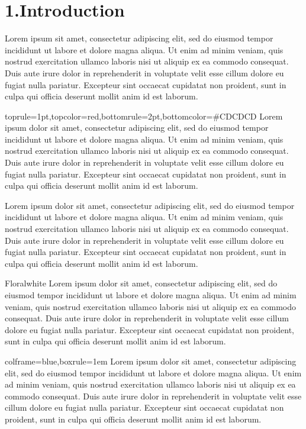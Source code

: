 \documentclass{book}
\newcommand\GFbox{%
  \collectbox*[\color{green}]{\fbox}%
}
\begin{document}
 
\section*{1.\enskip{}Introduction}
 
\GFbox{Lorem ipsum}  sit amet, consectetur adipiscing elit, sed do eiusmod tempor incididunt ut labore et dolore magna aliqua. Ut enim ad minim veniam, quis nostrud exercitation ullamco laboris nisi ut aliquip ex ea commodo consequat. Duis aute irure dolor in reprehenderit in voluptate velit esse cillum dolore eu fugiat nulla pariatur. Excepteur sint occaecat cupidatat non proident, sunt in culpa qui officia deserunt mollit anim id est laborum.

\begin{mdxborder}{toprule=1pt,topcolor=red,bottomrule=2pt,bottomcolor=\#CDCDCD}%
Lorem ipsum dolor sit amet, consectetur adipiscing elit, sed do eiusmod tempor incididunt ut labore et dolore magna aliqua. Ut enim ad minim veniam, quis nostrud
exercitation ullamco laboris nisi ut aliquip ex ea commodo consequat. Duis aute irure dolor in reprehenderit in voluptate velit esse cillum dolore eu fugiat nulla pariatur. Excepteur sint occaecat cupidatat non proident, sunt in culpa qui officia deserunt mollit anim id est laborum.
\end{mdxborder}%

Lorem ipsum dolor sit amet, consectetur adipiscing elit, sed do eiusmod tempor incididunt ut labore et dolore magna aliqua. Ut enim ad minim veniam, quis nostrud
exercitation ullamco laboris nisi ut aliquip ex ea commodo consequat. Duis aute irure dolor in reprehenderit in voluptate velit esse cillum dolore eu fugiat nulla pariatur. Excepteur sint occaecat cupidatat non proident, sunt in culpa qui officia deserunt mollit anim id est laborum.
 
\begin{mdxbgcolor}{Floralwhite}%
Lorem ipsum dolor sit amet, consectetur adipiscing elit, sed do eiusmod tempor incididunt ut labore et dolore magna aliqua. Ut enim ad minim veniam, quis nostrud
exercitation ullamco laboris nisi ut aliquip ex ea commodo consequat. Duis aute irure dolor in reprehenderit in voluptate velit esse cillum dolore eu fugiat nulla pariatur. Excepteur sint occaecat cupidatat non proident, sunt in culpa qui officia deserunt mollit anim id est laborum.

\begin{mdMarginLR}{1em}{2em}%
\begin{mdxborder}{colframe=blue,boxrule=1em}
Lorem ipsum dolor sit amet, consectetur adipiscing elit, sed do eiusmod tempor incididunt ut labore et dolore magna aliqua. Ut enim ad minim veniam, quis nostrud
exercitation ullamco laboris nisi ut aliquip ex ea commodo consequat. Duis aute irure dolor in reprehenderit in voluptate velit esse cillum dolore eu fugiat nulla pariatur. Excepteur sint occaecat cupidatat non proident, sunt in culpa qui officia deserunt mollit anim id est laborum.
\end{mdxborder}
\end{mdMarginLR}
\end{mdxbgcolor}
\end{document}
